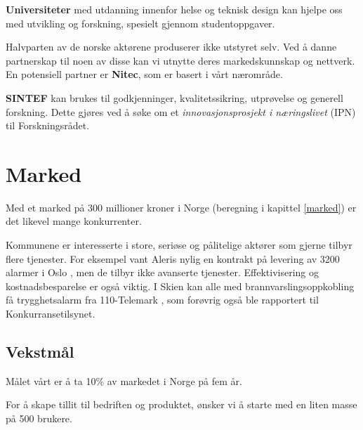 \textbf{Universiteter} med utdanning innenfor helse og teknisk design kan
hjelpe oss med utvikling og forskning, spesielt gjennom studentoppgaver.


Halvparten av de norske aktørene produserer ikke utstyret selv. Ved å danne
partnerskap til noen av disse kan vi utnytte deres markedskunnskap og nettverk.
En potensiell partner er \textbf{Nitec}, som er basert i vårt nærområde.

\textbf{SINTEF} kan brukes til godkjenninger, kvalitetssikring, utprøvelse og
generell forskning. Dette gjøres ved å søke om et \textit{innovasjonsprosjekt i
næringslivet} (IPN) til Forskningsrådet.

\section{Marked}



Med et marked på 300 millioner kroner i Norge (beregning i kapittel
\vref{marked}) er det likevel mange konkurrenter.

Kommunene er interesserte i store, seriøse og pålitelige aktører som gjerne
tilbyr flere tjenester.  For eksempel vant Aleris nylig en kontrakt på levering
av 3200 alarmer i Oslo \cite{telenor.aleris}, men de tilbyr ikke avanserte
tjenester. Effektivisering og kostnadsbesparelse er også viktig. I Skien kan
alle med brannvarslingsoppkobling få trygghetsalarm fra 110-Telemark
\cite{telemark.konkurransetilsyn}, som forøvrig også ble rapportert til
Konkurransetilsynet.

\subsection{Vekstmål}

Målet vårt er å ta 10\% av markedet i Norge på fem år.


For å skape tillit til bedriften og produktet, ønsker vi å starte med en liten
masse på 500 brukere.

